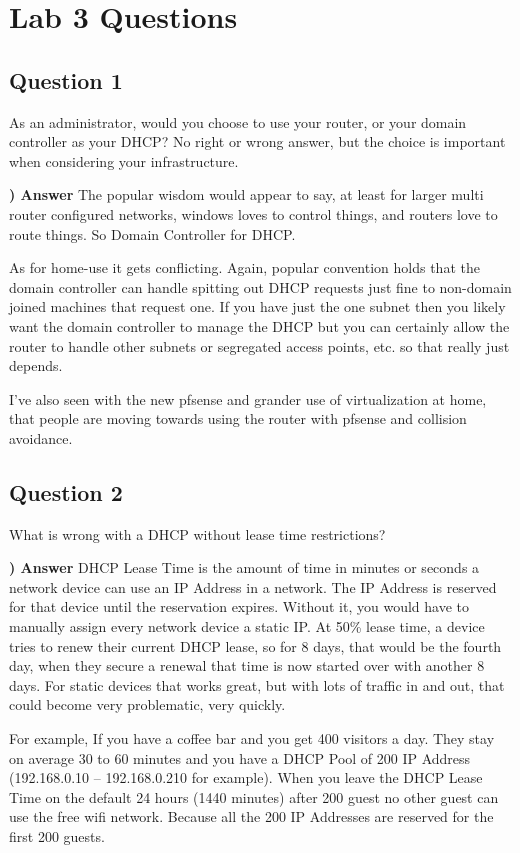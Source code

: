 \documentclass{report}
\title{\classinfo}
\author{\semester}
\date{\today}
\newcommand{\mysection}[1]{\section*{#1}}
\newcommand{\mysubsection}[2]{\textbf{\romannumeral #1) #2}}
\begin{document}
\maketitle

\chapter*{Lab 3 Questions}

\mysection{\textbf{Question 1}}
As an administrator, would you choose to use your router, 
or your domain controller as your DHCP? No right or wrong answer, 
but the choice is important when considering your
infrastructure.

\noindent\mysubsection{1}{Answer}
The popular wisdom would appear to say, at least for larger multi 
router configured networks, windows loves to control things, and 
routers love to route things. So Domain Controller for DHCP. 


As for home-use it gets conflicting. Again, popular convention holds 
that the domain controller can handle spitting out DHCP requests just 
fine to non-domain joined machines that request one. If you have just 
the one subnet then you likely want the domain controller to manage the 
DHCP but you can certainly allow the router to handle other subnets or 
segregated access points, etc. so that really just depends.


I've also seen with the new pfsense and grander use of virtualization at 
home, that people are moving towards using the router with pfsense 
and collision avoidance.


\mysection{\textbf{Question 2}}
What is wrong with a DHCP without lease time restrictions?  

\noindent\mysubsection{2}{Answer}
DHCP Lease Time is the amount of time in minutes or seconds a network device can use an
IP Address in a network. The IP Address is reserved for that device until the
reservation expires. Without it, you would have to manually assign every network
device a static IP. At 50\% lease time, a device tries to renew their current DHCP
lease, so for 8 days, that would be the fourth day, when they secure a renewal that
time is now started over with another 8 days. For static devices that works great, but
with lots of traffic in and out, that could become very problematic, very quickly.

For example, If you have a coffee bar and you get 400 visitors a day. They stay
on average 30 to 60 minutes and you have a DHCP Pool of 200 IP Address 
(192.168.0.10 – 192.168.0.210 for example). When you leave the DHCP Lease Time 
on the default 24 hours (1440 minutes) after 200 guest no other guest 
can use the free wifi network. Because all the 200 IP Addresses are 
reserved for the first 200 guests.
\end{document}

